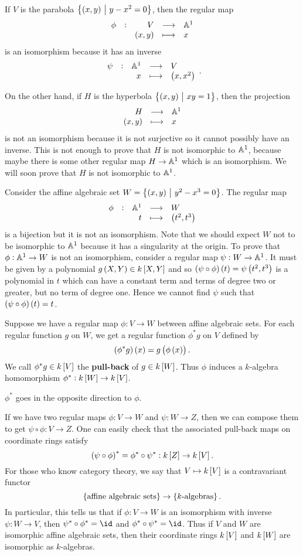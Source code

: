 \begin{example*}
If $ V $ is the parabola $ \cbr{\br{x, y} \st y - x^2 = 0} $, then the regular map
$$ \function[\phi]{V}{\AA^1}{\br{x, y}}{x} $$
is an isomorphism because it has an inverse
$$ \function[\psi]{\AA^1}{V}{x}{\br{x, x^2}}. $$
\end{example*}

\pagebreak

\begin{example*}
On the other hand, if $ H $ is the hyperbola $ \cbr{\br{x, y} \st xy = 1} $, then the projection
$$ \function{H}{\AA^1}{\br{x, y}}{x} $$
is not an isomorphism because it is not surjective so it cannot possibly have an inverse. This is not enough to prove that $ H $ is not isomorphic to $ \AA^1 $, because maybe there is some other regular map $ H \to \AA^1 $ which is an isomorphism. We will soon prove that $ H $ is not isomorphic to $ \AA^1 $.
\end{example*}

\begin{example*}
Consider the affine algebraic set $ W = \cbr{\br{x, y} \st y^2 - x^3 = 0} $. The regular map
$$ \function[\phi]{\AA^1}{W}{t}{\br{t^2, t^3}} $$
is a bijection but it is not an isomorphism. Note that we should expect $ W $ not to be isomorphic to $ \AA^1 $ because it has a singularity at the origin. To prove that $ \phi : \AA^1 \to W $ is not an isomorphism, consider a regular map $ \psi : W \to \AA^1 $. It must be given by a polynomial $ g\br{X, Y} \in k\sbr{X, Y} $ and so $ \br{\psi \circ \phi}\br{t} = \psi\br{t^2, t^3} $ is a polynomial in $ t $ which can have a constant term and terms of degree two or greater, but no term of degree one. Hence we cannot find $ \psi $ such that $ \br{\psi \circ \phi}\br{t} = t $.
\end{example*}

Suppose we have a regular map $ \phi : V \to W $ between affine algebraic sets. For each regular function $ g $ on $ W $, we get a regular function $ \phi^*g $ on $ V $ defined by
$$ \br{\phi^*g}\br{x} = g\br{\phi\br{x}}. $$
We call $ \phi^*g \in k\sbr{V} $ the \textbf{pull-back} of $ g \in k\sbr{W} $. Thus $ \phi $ induces a $ k $-algebra homomorphism $ \phi^* : k\sbr{W} \to k\sbr{V} $.

\begin{note*}
$ \phi^* $ goes in the opposite direction to $ \phi $.
\end{note*}

If we have two regular maps $ \phi : V \to W $ and $ \psi : W \to Z $, then we can compose them to get $ \psi \circ \phi : V \to Z $. One can easily check that the associated pull-back maps on coordinate rings satisfy
$$ \br{\psi \circ \phi}^* = \phi^* \circ \psi^* : k\sbr{Z} \to k\sbr{V}. $$
For those who know category theory, we say that $ V \mapsto k\sbr{V} $ is a contravariant functor
$$ \cbr{\text{affine algebraic sets}} \to \cbr{\text{$ k $-algebras}}. $$
In particular, this tells us that if $ \phi : V \to W $ is an isomorphism with inverse $ \psi : W \to V $, then $ \psi^* \circ \phi^* = \id $ and $ \phi^* \circ \psi^* = \id $. Thus if $ V $ and $ W $ are isomorphic affine algebraic sets, then their coordinate rings $ k\sbr{V} $ and $ k\sbr{W} $ are isomorphic as $ k $-algebras.

